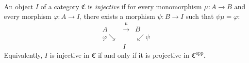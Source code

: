 An object $I$ of a category $\mathfrak{C}$ is \textit{injective} if for every monomorphism $\mu : A \to B$ and every morphism $\varphi : A \to I$, there exists a morphism $\psi : B \to I$ such that $\psi \mu = \varphi$:
$$
\begin{array}{ccc}
A & \xrightarrow{\mu} & B \\
{\scriptstyle\varphi}\searrow & & \swarrow{\scriptstyle\psi} \\
& I &
\end{array}
$$
Equivalently, $I$ is injective in $\mathfrak{C}$ if and only if it is projective in $\mathfrak{C}^{\text{opp}}$.
